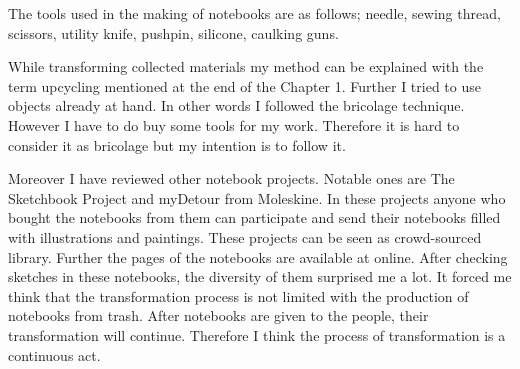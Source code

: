 


The tools used in the making of notebooks are as follows; needle, sewing thread, scissors, utility knife, pushpin, silicone, caulking guns.

While transforming collected materials my method can be explained with the term upcycling mentioned at the end of the Chapter 1. Further I tried to use objects already at hand. In other words I followed the bricolage technique. However I have to do buy some tools for my work. Therefore it is hard to consider it as bricolage but my intention is to follow it.

Moreover I have reviewed other notebook projects. Notable ones are The Sketchbook Project and myDetour from Moleskine. In these projects anyone who bought the notebooks from them can participate and send their notebooks filled with illustrations and paintings. These projects can be seen as crowd-sourced library. Further the pages of the notebooks are available at online. After checking sketches in these notebooks, the diversity of them surprised me a lot. It forced me think that the transformation process is not limited with the production of notebooks from trash. After notebooks are given to the people, their transformation will continue. Therefore I think the process of transformation is a continuous act.










